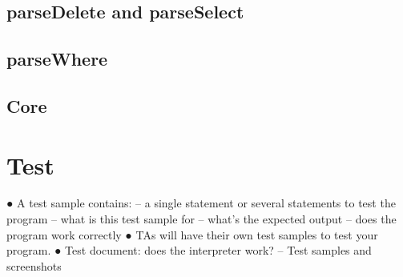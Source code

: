 \documentclass[12pt,a4paper,oneside,draft]{report}
\begin{document}
\subsection{parseDelete and parseSelect}
\subsection{parseWhere}
\subsection{Core}

\section{Test}
● A test sample contains:
– a single statement or several statements to test the
program
– what is this test sample for
– what's the expected output
– does the program work correctly
● TAs will have their own test samples to test
your program.
● Test document: does the interpreter work?
– Test samples and screenshots
\end{document}
